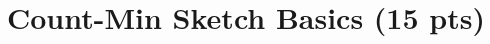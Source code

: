 \documentclass{exam}
\newcommand{\grade}[1]{\small\textcolor{magenta}{\emph{[#1 points]}} \normalsize}
\newcommand{\sol}[1]{\ifshowsolutions{\leavevmode{\color{blue}Solution: #1}}\fi}
\newif\ifshowsolutions
\begin{document}


\newpage
\section{Count-Min Sketch Basics (15 pts)} 
\end{document}
